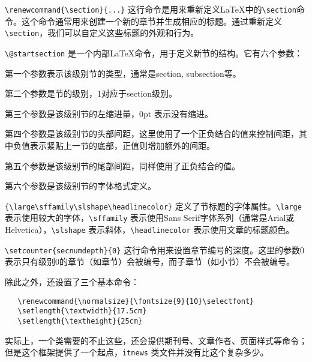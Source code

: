\documentclass[12pt]{ltxguide}
\begin{document}
\begin{compactenum}[1.]
  \item \verb|\renewcommand{\section}{...}| 这行命令是用来重新定义\LaTeX{}中的\verb|\section|命令。这个命令通常用来创建一个新的章节并生成相应的标题。通过重新定义\verb|\section|，我们可以自定义这些标题的外观和行为。
  \item \verb|\@startsection| 是一个内部\LaTeX{}命令，用于定义新节的结构。它有六个参数：
      \begin{compactenum}
        \item 第一个参数表示该级别节的类型，通常是section, subsection等。
        \item 第二个参数是节的级别，1对应于section级别。
        \item 第三个参数是该级别节的左缩进量，0pt 表示没有缩进。
        \item 第四个参数是该级别节的头部间距，这里使用了一个正负结合的值来控制间距，其中负值表示紧贴上一节的底部，正值则增加额外的间距。
        \item 第五个参数是该级别节的尾部间距，同样使用了正负结合的值。
        \item 第六个参数是该级别节的字体格式定义。
      \end{compactenum}
  \item  \verb|{\large\sffamily\slshape\headlinecolor}| 定义了节标题的字体属性。\verb|\large| 表示使用较大的字体，\verb|\sffamily| 表示使用Sans Serif字体系列（通常是Arial或Helvetica），\verb|\slshape| 表示斜体，\verb|\headlinecolor| 表示使用文章的标题颜色。
  \item \verb|\setcounter{secnumdepth}{0}| 这行命令用来设置章节编号的深度。这里的参数0表示只有级别0的章节（如章节）会被编号，而子章节（如小节）不会被编号。
\end{compactenum}
除此之外，还设置了三个基本命令：
\begin{verbatim}
   \renewcommand{\normalsize}{\fontsize{9}{10}\selectfont}
   \setlength{\textwidth}{17.5cm}
   \setlength{\textheight}{25cm}
\end{verbatim}
实际上，一个类需要的不止这些，还会提供期刊号、文章作者、页面样式等命令；但是这个框架提供了一个起点，\verb|itnews| 类文件并没有比这个复杂多少。
%
\end{document}
